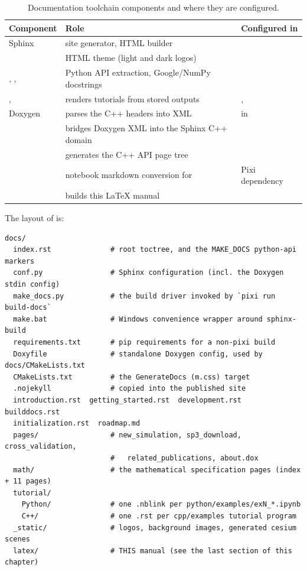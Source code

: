 \begin{table}[H]
  \centering
  \caption{Documentation toolchain components and where they are configured.}
  \label{tab:bd-toolchain}
  \small
  \begin{tabularx}{\textwidth}{@{}l L L@{}}
    \toprule
    Component & Role & Configured in \\
    \midrule
    Sphinx           & site generator, HTML builder &  \\
          & HTML theme (light and dark logos) &  \\
    , , 
                     & Python API extraction, Google/NumPy docstrings &  \\
    , 
                     & renders  tutorials from stored outputs
                     & ,  \\
    Doxygen          & parses the C++ headers into XML
                     &  in  \\
       & bridges Doxygen XML into the Sphinx C++ domain &  \\
        & generates the C++ API page tree &  \\
        & notebook markdown conversion for  & Pixi dependency \\
      & builds this LaTeX manual &  \\
    \bottomrule
  \end{tabularx}
\end{table}

The layout of  is:

\begin{lstlisting}[language=shell]
docs/
  index.rst              # root toctree, and the MAKE_DOCS python-api markers
  conf.py                # Sphinx configuration (incl. the Doxygen stdin config)
  make_docs.py           # the build driver invoked by `pixi run build-docs`
  make.bat               # Windows convenience wrapper around sphinx-build
  requirements.txt       # pip requirements for a non-pixi build
  Doxyfile               # standalone Doxygen config, used by docs/CMakeLists.txt
  CMakeLists.txt         # the GenerateDocs (m.css) target
  .nojekyll              # copied into the published site
  introduction.rst  getting_started.rst  development.rst  builddocs.rst
  initialization.rst  roadmap.md
  pages/                 # new_simulation, sp3_download, cross_validation,
                         #   related_publications, about.dox
  math/                  # the mathematical specification pages (index + 11 pages)
  tutorial/
    Python/              # one .nblink per python/examples/exN_*.ipynb
    C++/                 # one .rst per cpp/examples tutorial program
  _static/               # logos, background images, generated cesium scenes
  latex/                 # THIS manual (see the last section of this chapter)
\end{lstlisting}

